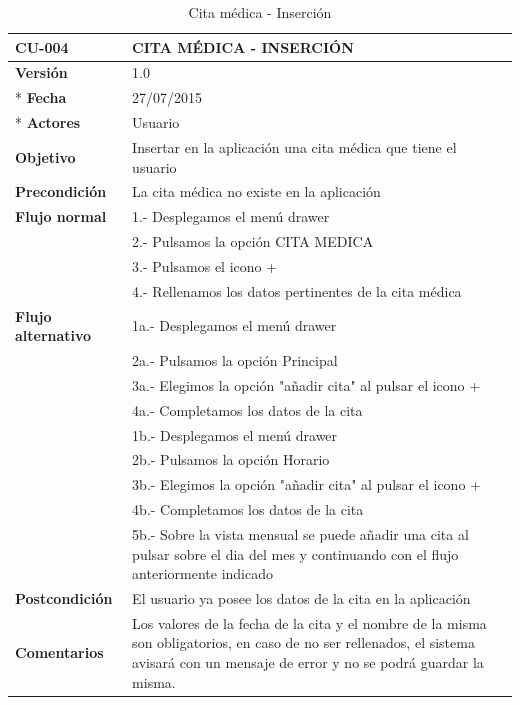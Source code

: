 \documentclass[../pfc.tex]{subfiles}
\begin{document}
	\begin{table}[!hbt]
		\centering
		\begin{tabular}[t]{|p{3cm}|p{9.5cm}|}
			\hline \textbf{CU-004} & \textbf{CITA MÉDICA - INSERCIÓN} \\*
			\hline\hline \textbf{Versión} & 1.0 \\ *
			\hline\hline \textbf{Fecha} & 27/07/2015 \\ *
			\hline\textbf{Actores} 	& Usuario\\*
			\hline \textbf{Objetivo} & Insertar en la aplicación una cita médica que tiene el usuario\\* 			
			\hline \textbf{Precondición} & La cita médica no existe en la aplicación\\* 
			\hline \textbf{Flujo normal} & 1.- Desplegamos el menú drawer \\* 
			& 2.- Pulsamos la opción CITA MEDICA\\*	
			& 3.- Pulsamos el icono +\\*	
			& 4.- Rellenamos los datos pertinentes de la cita médica\\*	
			\hline \textbf{Flujo alternativo} & 1a.- Desplegamos el menú drawer \\* 
			& 2a.- Pulsamos la opción Principal \\*	
			& 3a.- Elegimos la opción "añadir cita" al pulsar el icono +\\*	
			& 4a.- Completamos los datos de la cita\\*	
			& 1b.- Desplegamos el menú drawer \\* 
			& 2b.- Pulsamos la opción Horario \\*	
			& 3b.- Elegimos la opción "añadir cita" al pulsar el icono +\\*	
			& 4b.- Completamos los datos de la cita\\*	
			& 5b.- Sobre la vista mensual se puede añadir una cita al pulsar sobre el dia del mes y continuando con el flujo anteriormente indicado\\*	
			\hline \textbf{Postcondición} & El usuario ya posee los datos de la cita en la aplicación \\* 
			\hline \textbf{Comentarios}   & Los valores de la fecha de la cita y el nombre de la misma son obligatorios, en caso de no ser rellenados, el sistema avisará con un mensaje de error y no se podrá guardar la misma.\\*
			\hline
		\end{tabular}
		\caption{Cita médica - Inserción}
		\label{tabla:caso004}
	\end{table}
\end{document}
